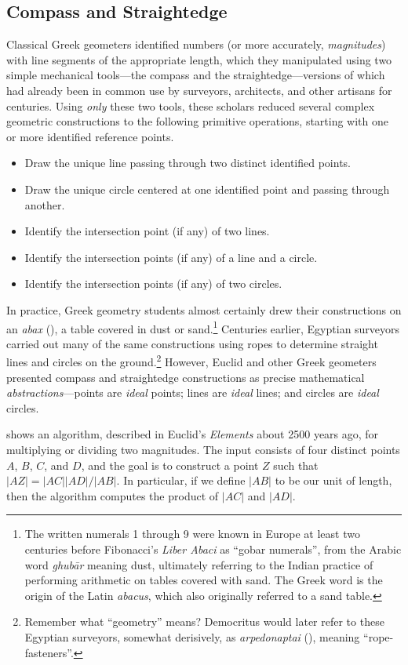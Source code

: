 \subsection{Compass and Straightedge}
Classical Greek geometers identified numbers (or more accurately, \textit{magnitudes}) with line segments of the appropriate length, which they manipulated using two simple mechanical tools—the compass and the straightedge—versions of which had already been in common use by surveyors, architects, and other artisans for centuries. Using \textit{only} these two tools, these scholars reduced several complex geometric constructions to the following primitive operations, starting with one or more identified reference points.
\begin{itemize}
\item Draw the unique line passing through two distinct identified points.
\item Draw the unique circle centered at one identified point and passing through another.
\item Identify the intersection point (if any) of two lines.
\item Identify the intersection points (if any) of a line and a circle.
\item Identify the intersection points (if any) of two circles.
\end{itemize}
In practice, Greek geometry students almost certainly drew their constructions on an \textit{abax} (), a table covered in dust or sand.\footnote{The written numerals 1 through 9 were known in Europe at least two centuries before Fibonacci’s \textit{Liber Abaci} as “gobar numerals”, from the Arabic word \textit{ghub\=ar} meaning dust, ultimately referring to the Indian practice of performing arithmetic on tables covered with sand. The Greek word  is the origin of the Latin \textit{abacus}, which also originally referred to a sand table.} Centuries earlier, Egyptian surveyors carried out many of the same constructions using ropes to determine straight lines and circles on the ground.\footnote{Remember what “geometry” means? Democritus would later refer to these Egyptian surveyors, somewhat derisively, as \textit{arpedonaptai} (), meaning “rope-fasteners”.} However, Euclid and other Greek geometers presented compass and straightedge constructions as precise mathematical \textit{abstractions}—points are \textit{ideal} points; lines are \textit{ideal} lines; and circles are \textit{ideal} circles.

 shows an algorithm, described in Euclid’s \textit{Elements} about 2500 years ago, for multiplying or dividing two magnitudes. The input consists of four distinct points $A$, $B$, $C$, and $D$, and the goal is to construct a point $Z$ such that $|AZ| = |AC||AD|/|AB|$. In particular, if we define $|AB|$ to be our unit of length, then the algorithm computes the product of $|AC|$ and $|AD|$.

